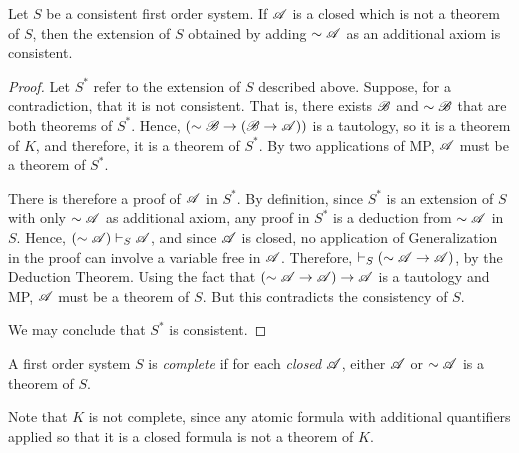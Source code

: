 \begin{proposition}
  Let \(S\) be a consistent first order system. If \(\mathscr{A}\) is a closed \wf{} which is not a theorem of \(S\), then the extension of \(S\) obtained by adding \(\sim\mathscr{A}\) as an additional axiom is consistent.

  \begin{proof}
    Let \(S^*\) refer to the extension of \(S\) described above. Suppose, for a contradiction, that it is not consistent. That is, there exists \wf{} \(\mathscr{B}\) and \(\sim\mathscr{B}\) that are both theorems of \(S^*\). Hence, \((\sim\mathscr{B} \rightarrow (\mathscr{B} \rightarrow \mathscr{A}))\) is a tautology, so it is a theorem of \(K\), and therefore, it is a theorem of \(S^*\). By two applications of MP, \(\mathscr{A}\) must be a theorem of \(S^*\).

    There is therefore a proof of \(\mathscr{A}\) in \(S^*\). By definition, since \(S^*\) is an extension of \(S\) with only \(\sim\mathscr{A}\) as additional axiom, any proof in \(S^*\) is a deduction from \(\sim\mathscr{A}\) in \(S\). Hence, \((\sim\mathscr{A}) \vdash_{S} \mathscr{A}\), and since \(\mathscr{A}\) is closed, no application of Generalization in the proof can involve a variable free in \(\mathscr{A}\). Therefore, \(\vdash_{S} (\sim\mathscr{A} \rightarrow \mathscr{A})\), by the Deduction Theorem. Using the fact that \((\sim\mathscr{A} \rightarrow \mathscr{A}) \rightarrow \mathscr{A}\) is a tautology and MP, \(\mathscr{A}\) must be a theorem of \(S\). But this contradicts the consistency of \(S\).

    We may conclude that \(S^*\) is consistent.
  \end{proof}
\end{proposition}

  \begin{definition}
    A first order system \(S\) is \textit{complete} if for each \textit{closed} \wf{} \(\mathscr{A}\), either \(\mathscr{A}\) or \(\sim\mathscr{A}\) is a theorem of \(S\).
  \end{definition}

  Note that \(K\) is not complete, since any atomic formula with additional quantifiers applied so that it is a closed formula is not a theorem of \(K\).


